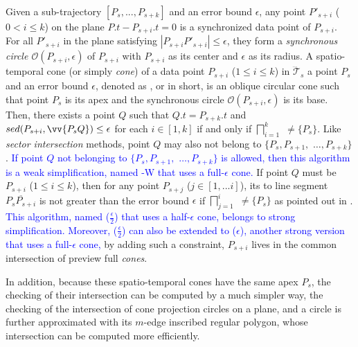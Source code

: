 Given a sub-trajectory $[P_s,...,P_{s+k}]$ and an error bound $\epsilon$, any point $P'_{s+i}$ ($0< i \le k$) on the plane $P.t-P_{s+i}.t = 0$ is a synchronized data point of $P_{s+i}$. For all $P'_{s+i}$ in the plane satisfying $|P_{s+i}P'_{s+i}| \le \epsilon$, they form a \textit{synchronous circle $\mathcal{O}(P_{s+i}, \epsilon)$} of $P_{s+i}$ with $P_{s+i}$ as its center and $\epsilon$ as its radius.
%
A spatio-temporal cone (or simply \textit{cone}) of a data point $P_{s+i}$ ($1\le i\le k$) in $\dddot{\mathcal{T}}_s$ \wrt a point $P_s$ and an error bound $\epsilon$, denoted as , or  in short, is an oblique circular cone such that point $P_s$ is its apex and the synchronous circle $\mathcal{O}(P_{s+i}, \epsilon)$ is its base.
%
Then, there exists a point $Q$ such that $Q.t = P_{s+k}.t$ and $sed(P_{s+i}, \vv{P_sQ})\le \epsilon$ for each $i \in [1,k]$ if and only if $\bigsqcap_{i=1}^{k}$ $\ne \{P_s\}$.
%
Like \textit{sector intersection} methods, point $Q$ may also not belong to $\{P_{s}, P_{s+1},$ $\ldots, P_{s+k}\}$. 
\textcolor{blue}{If point $Q$ not belonging to $\{P_{s}, P_{s+1},$ $\ldots, P_{s+k}\}$ is allowed, then this algorithm is a weak simplification, named \cised-W that uses a full-$\epsilon$ cone.}
If point $Q$ must be $P_{s+i}$ ($1\le i\le k$), then for any point $P_{s+j}$ ($j \in [1, ... i]$), its \sed to line segment $\overline{P_sP_{s+i}}$ is not greater than the error bound $\epsilon$ if
$\bigsqcap_{j=1}^{i}$ $\ne \{P_s\}$ as pointed out in \cite{Lin:Cised}. 
\textcolor{blue}{This algorithm, named \cised($\frac{\epsilon}{2}$) that uses a half-$\epsilon$ cone, belongs to strong simplification.}
\textcolor{blue}{Moreover, \cised($\frac{\epsilon}{2}$) can also be extended to \cised(${\epsilon}$), another strong version that uses a full-${\epsilon}$ cone,} by adding such a constraint, \ie $P_{s+i}$ lives in the common intersection of preview full \emph{cones}.

In addition, because these spatio-temporal cones have the same apex $P_s$, the checking of their intersection can be computed by a much simpler way, \ie the checking of the intersection of cone projection circles on a plane, and a circle is further approximated with its $m$-edge inscribed regular polygon, whose intersection can be computed more efficiently. %



